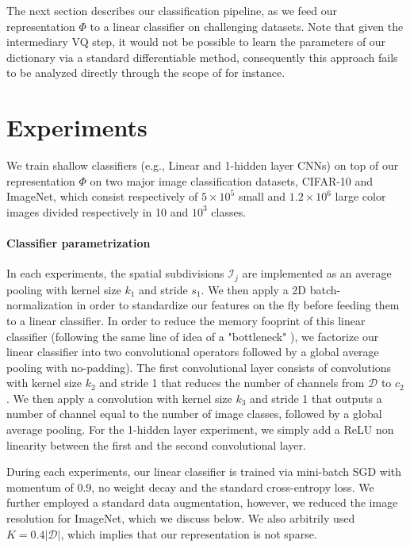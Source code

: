 \documentclass{article}
\begin{document}
The next section describes our classification pipeline, as we feed our representation $\Phi$ to a linear classifier on challenging datasets. Note that given the intermediary VQ step, it would not be possible to learn the parameters of our dictionary via a standard differentiable method, consequently this approach fails to be analyzed directly through the scope of \cite{chizat2018global} for instance.




\section{Experiments}
\label{experiments}
We train  shallow classifiers (e.g., Linear and 1-hidden layer CNNs) on top of our representation $\Phi$ on two major  image classification datasets,  CIFAR-10 and ImageNet, which consist respectively of $5\times10^5$ small and $1.2\times10^6$ large color images  divided respectively in 10 and $10^3$ classes.


\paragraph{Classifier parametrization} In each experiments, the spatial subdivisions $\mathcal{I}_j$ are implemented as an average pooling with kernel size $k_1$ and stride $s_1$.
We then apply a 2D batch-normalization \citep{ioffe2015batch} in order to standardize our features on the fly before feeding them to a linear classifier.
In order to reduce the memory fooprint of this linear classifier (following the same line of idea of a "bottleneck" \cite{he2016deep}), we factorize our linear classifier into two convolutional operators followed by a global average pooling with no-padding).  The first convolutional layer  consists of  convolutions with kernel size $k_2$ and stride 1 that reduces the number of channels from $\mathcal{D}$ to $c_2$. 
We then apply a  convolution with kernel size $k_3$ and stride 1 that outputs a number of channel equal to the number of image classes, followed by a global average pooling.
For the 1-hidden layer experiment, we simply add a ReLU non linearity between the first and the second convolutional layer.

During each experiments,  our linear classifier is trained via mini-batch SGD with momentum of 0.9, no weight decay and the standard cross-entropy loss. We further employed a standard data augmentation, however, we reduced the image resolution for ImageNet, which we discuss below. We also arbitrily used $K=0.4 |\mathcal{D}|$, which implies that our representation is not sparse.
\end{document}
